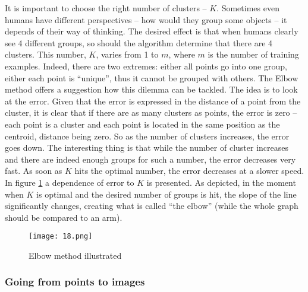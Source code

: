       It is important to choose the right number of clusters -- \( K \). Sometimes even humans have different perspectives -- how would they group some objects -- it depends of their way of thinking. The desired effect is that when humans clearly see 4 different groups, so should the algorithm determine that there are 4 clusters. This number, \( K \), varies from 1 to \( m \), where \( m \) is the number of training examples. Indeed, there are two extremes: either all points go into one group, either each point is ``unique'', thus it cannot be grouped with others. The Elbow method offers a suggestion how this dilemma can be tackled. The idea is to look at the error. Given that the error is expressed in the distance of a point from the cluster, it is clear that if there are as many clusters as points, the error is zero -- each point is a cluster and each point is located in the same position as the centroid, distance being zero. So as the number of clusters increases, the error goes down. The interesting thing is that while the number of cluster increases and there are indeed enough groups for such a number, the error decreases very fast. As soon as \( K \) hits the optimal number, the error decreases at a slower speed. In figure \ref{elbow} a dependence of error to \( K \) is presented. As depicted, in the moment when \( K \) is optimal and the desired number of groups is hit, the slope of the line significantly changes, creating what is called ``the elbow'' (while the whole graph should be compared to an arm). 

      \begin{figure}[b!]
        \centering
        \texttt{[image: 18.png]} 
        \caption{Elbow method illustrated}
        \label{elbow}
      \end{figure}


    \subsubsection{Going from points to images}

